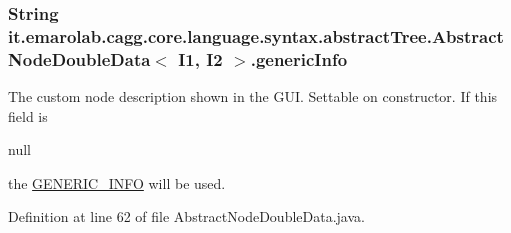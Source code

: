 \hypertarget{classit_1_1emarolab_1_1cagg_1_1core_1_1language_1_1syntax_1_1abstractTree_1_1AbstractNodeDoubleData_3_01I1_00_01I2_01_4_a5ef36526dc1f963c1c7fb5ca96b098ae}{
\subsubsection[{generic\-Info}]{\setlength{\rightskip}{0pt plus 5cm}String it.\-emarolab.\-cagg.\-core.\-language.\-syntax.\-abstract\-Tree.\-Abstract\-Node\-Double\-Data$<$ I1, I2 $>$.generic\-Info\hspace{0.3cm}{\ttfamily [protected]}}}\label{classit_1_1emarolab_1_1cagg_1_1core_1_1language_1_1syntax_1_1abstractTree_1_1AbstractNodeDoubleData_3_01I1_00_01I2_01_4_a5ef36526dc1f963c1c7fb5ca96b098ae}
The custom node description shown in the G\-U\-I. Settable on constructor. If this field is
\begin{DoxyCode}
null 
\end{DoxyCode}
 the \hyperlink{classit_1_1emarolab_1_1cagg_1_1core_1_1language_1_1syntax_1_1abstractTree_1_1AbstractNodeDoubleData_3_01I1_00_01I2_01_4_a7abbd84bcdf4a8fec6062304885b93e2}{G\-E\-N\-E\-R\-I\-C\-\_\-\-I\-N\-F\-O} will be used. 

Definition at line 62 of file Abstract\-Node\-Double\-Data.\-java.

